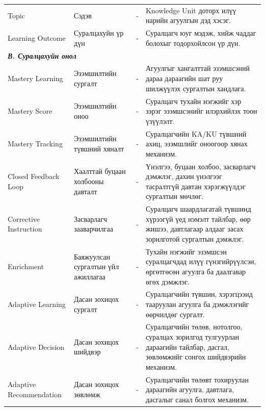 {\begin{longtable}{p{} p{} p{} p{}}
Topic & Сэдэв & - & Knowledge Unit доторх илүү нарийн агуулгын дэд хэсэг. \\

Learning Outcome & Суралцахуйн үр дүн & - & Суралцагч юуг мэдэж, хийж чаддаг болохыг тодорхойлсон үр дүн. \\

\midrule
\multicolumn{4}{l}{\textbf{\textit{В. Суралцахуйн онол}}} \\
\midrule

Mastery Learning & Эзэмшилтийн сургалт & - & Агуулгыг хангалттай эзэмшсэний дараа дараагийн шат руу шилжүүлэх сургалтын хандлага. \\

Mastery Score & Эзэмшилтийн оноо & - & Суралцагч тухайн нэгжийг хэр зэрэг эзэмшсэнийг илэрхийлэх тоон үзүүлэлт. \\

Mastery Tracking & Эзэмшилтийн түвшний хяналт & - & Суралцагчийн KA/KU түвшний ахиц, эзэмшлийг оноогоор хянах механизм. \\

Closed Feedback Loop & Хаалттай буцаан холбооны давталт & - & Үнэлгээ, буцаан холбоо, засварлагч дэмжлэг, дахин үнэлгээг тасралтгүй давтан хэрэгжүүлдэг сургалтын мөчлөг. \\

Corrective Instruction & Засварлагч зааварчилгаа & - & Суралцагч шаардлагатай түвшинд хүрээгүй үед нэмэлт тайлбар, өөр жишээ, давтлагаар алдааг засах зорилготой сургалтын дэмжлэг. \\

Enrichment & Баяжуулсан сургалтын үйл ажиллагаа & - & Тухайн нэгжийг эзэмшсэн суралцагчдад илүү гүнзгийрүүлсэн, өргөтгөсөн агуулга ба даалгавар өгөх дэмжлэг. \\

Adaptive Learning & Дасан зохицох сургалт & - & Суралцагчийн түвшин, хэрэгцээнд тааруулан агуулга ба дэмжлэгийг өөрчилдөг сургалт. \\

Adaptive Decision & Дасан зохицох шийдвэр & - & Суралцагчийн төлөв, нотолгоо, суралцах зорилгод тулгуурлан дараагийн тайлбар, дасгал, зөвлөмжийг сонгох шийдвэрийн механизм. \\

Adaptive Recommendation & Дасан зохицох зөвлөмж & - & Суралцагчийн төлөвт тохируулан дараагийн агуулга, давтлага, дасгалыг санал болгох механизм. \\


\end{longtable}}
